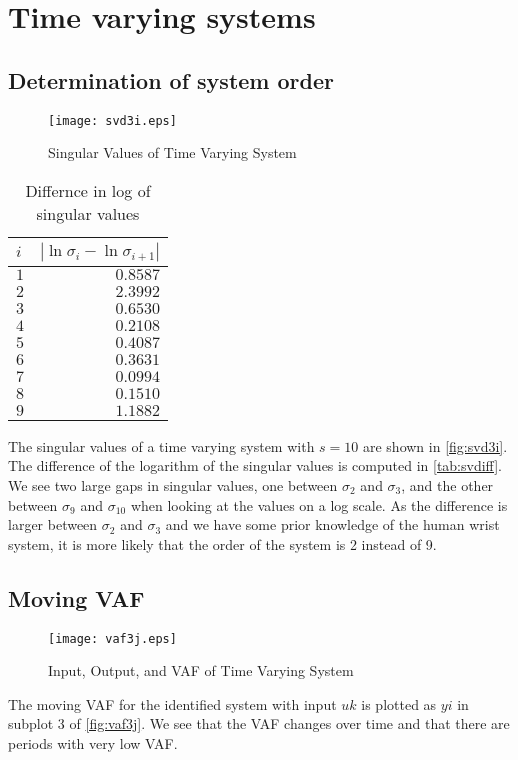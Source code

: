 \documentclass[11pt,a4paper]{article}
\begin{document}
\section{Time varying systems}

\subsection{Determination of system order}
\begin{figure}
    \centering
    \texttt{[image: svd3i.eps]}
    \caption{Singular Values of Time Varying System}
    \label{fig:svd3i}
\end{figure}
\begin{table}
    \centering
    \begin{tabular}{|l|r|}
        \hline
        $i$ & $ |\ln \sigma_i - \ln \sigma_{i + 1}|$ \\
        \hline
        $ 1 $ & $ 0.8587 $ \\
        $ 2 $ & $ 2.3992 $ \\
        $ 3 $ & $ 0.6530 $ \\
        $ 4 $ & $ 0.2108 $ \\
        $ 5 $ & $ 0.4087 $ \\
        $ 6 $ & $ 0.3631 $ \\
        $ 7 $ & $ 0.0994 $ \\
        $ 8 $ & $ 0.1510 $ \\
        $ 9 $ & $ 1.1882 $ \\
        \hline
    \end{tabular}
    \caption{Differnce in log of singular values}
    \label{tab:svdiff}
\end{table}
The singular values of a time varying system with $s = 10$ are shown in
\autoref{fig:svd3i}. The difference of the logarithm of the singular values is
computed in \autoref{tab:svdiff}. We see two large gaps in singular values, one
between $\sigma_2$ and $\sigma_3$, and the other between $\sigma_9$ and
$\sigma_{10}$ when looking at the values on a log scale. As the difference is
larger between $\sigma_2$ and $\sigma_3$ and we have some prior knowledge of
the human wrist system, it is more likely that the order of the system is 2
instead of 9.

\subsection{Moving VAF}
\begin{figure}
    \centering
    \texttt{[image: vaf3j.eps]}
    \caption{Input, Output, and VAF of Time Varying System}
    \label{fig:vaf3j}
\end{figure}
The moving VAF for the identified system with input $uk$ is plotted as $yi$ in
subplot 3 of \autoref{fig:vaf3j}. We see that the VAF changes over time and
that there are periods with very low VAF.
\end{document}
